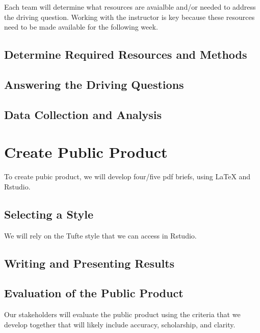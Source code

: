 \documentclass{article}\usepackage[]{graphicx}\usepackage[]{color}
\begin{document}
Each team will determine what resources are avaialble and/or needed to address the driving question. Working with the instructor is key because these resources need to be made available for the following week.

\subsection{Determine Required Resources and Methods}


\subsection{Answering the Driving Questions}

\subsection{Data Collection and Analysis}

\section{Create Public Product}

To create pubic product, we will develop four/five pdf briefs, using LaTeX and Rstudio. 

\subsection{Selecting a Style}

We will rely on the Tufte style that we can access in Rstudio. 

\subsection{Writing and Presenting Results}

\subsection{Evaluation of the Public Product}

Our stakeholders will evaluate the public product using the criteria that we develop together that will likely include accuracy, scholarship, and clarity. 
\end{document}
